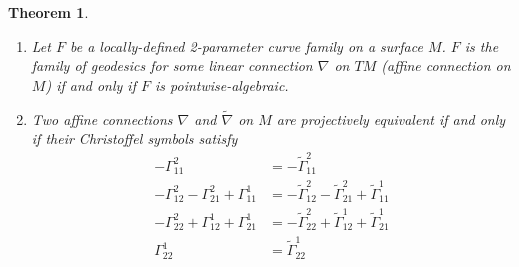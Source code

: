 \documentclass[12pt]{article}
\numberwithin{equation}{section}
\theoremstyle{plain}
\newtheorem{theorem}[definition]{Theorem}
\theoremstyle{definition}
\begin{document}
\begin{theorem}\label{p2}\
\begin{enumerate}
\itemsep0em
\item{\label{paG}Let $F$ be a locally-defined 2-parameter curve family on a surface $M$. $F$ is the family of geodesics for some linear connection $\nabla$ on $TM$ (affine connection on $M$) if and only if $F$ is pointwise-algebraic.}
\item{\label{formGGt}Two affine connections $\nabla$ and $\tilde{\nabla}$ on $M$ are projectively equivalent if and only if their Christoffel symbols satisfy
\begin{align*}
-\Gamma^{2}_{11}&=-\tilde{\Gamma}^{2}_{11}\\
-\Gamma^{2}_{12}-\Gamma^{2}_{21} +\Gamma^{1}_{11}&=-\tilde{\Gamma}^{2}_{12}-\tilde{\Gamma}^{2}_{21} +\tilde{\Gamma}^{1}_{11}\\
-\Gamma^{2}_{22}+\Gamma^{1}_{12} +\Gamma^{1}_{21}&=-\tilde{\Gamma}^{2}_{22}+\tilde{\Gamma}^{1}_{12} +\tilde{\Gamma}^{1}_{21}\\
\Gamma^{1}_{22}&= \tilde{\Gamma}^{1}_{22}
\end{align*}}
\end{enumerate}
\end{theorem}
\end{document}

